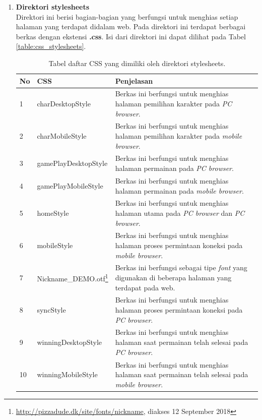 \begin{enumerate}
\begin{enumerate}
\begin{enumerate}
		\end{enumerate}
		\item \textbf{Direktori stylesheets} \\ 
		Direktori ini berisi bagian-bagian yang berfungsi untuk menghias setiap halaman yang terdapat didalam web. Pada direktori ini terdapat berbagai berkas dengan ekstensi \textbf{.css}. Isi dari direktori ini dapat dilihat pada Tabel \ref{table:css_stylesheets}.
		\begin{table}[H]
			\centering
			\caption{Tabel daftar CSS yang dimiliki oleh direktori stylesheets.}
			\begin{tabular}{|p{0.35cm}|p{4cm}|p{7cm}|}
				\hline
				No & CSS & Penjelasan \\ \hline
				1 & charDesktopStyle & Berkas ini berfungsi untuk menghias halaman pemilihan karakter pada \textit{PC browser}. \\ \hline
				2 & charMobileStyle & Berkas ini berfungsi untuk menghias halaman pemilihan karakter pada \textit{mobile browser}. \\ \hline
				3 & gamePlayDesktopStyle & Berkas ini berfungsi untuk menghias halaman permainan pada \textit{PC browser}. \\ \hline
				4 & gamePlayMobileStyle & Berkas ini berfungsi untuk menghias halaman permainan pada \textit{mobile browser}. \\ \hline
				5 & homeStyle & Berkas ini berfungsi untuk menghias halaman utama pada \textit{PC browser} dan \textit{PC browser}. \\ \hline
				6 & mobileStyle & Berkas ini berfungsi untuk menghias halaman proses permintaan koneksi pada \textit{mobile browser}. \\ \hline
				7 & Nickname\_DEMO.otf\footnote{\url{http://pizzadude.dk/site/fonts/nickname}, diakses 12 September 2018} & Berkas ini berfungsi sebagai tipe \textit{font} yang digunakan di beberapa halaman yang terdapat pada web. \\ \hline
				8 & syncStyle & Berkas ini berfungsi untuk menghias halaman proses permintaan koneksi pada \textit{PC browser}. \\ \hline
				9 & winningDesktopStyle & Berkas ini berfungsi untuk menghias halaman saat permainan telah selesai pada \textit{PC browser}. \\ \hline
				10 & winningMobileStyle & Berkas ini berfungsi untuk menghias halaman saat permainan telah selesai pada \textit{mobile browser}. \\ \hline

\end{tabular}
\end{table}
\end{enumerate}
\end{enumerate}
